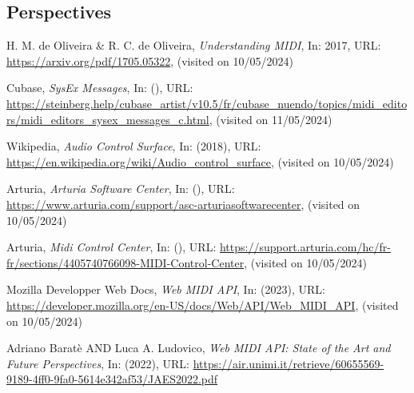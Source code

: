\documentclass[francais]{rapportPFE}  %
\begin{document}
\subsection{Perspectives}





\begin{thebibliography}{9}

      H. M. de Oliveira \& R. C. de Oliveira,
      \textit{Understanding MIDI},
      In: 2017,
      URL: \url{https://arxiv.org/pdf/1705.05322},
      (visited on 10/05/2024)

        Cubase,
        \textit{SysEx Messages},
        In: (),
        URL: \url{https://steinberg.help/cubase_artist/v10.5/fr/cubase_nuendo/topics/midi_editors/midi_editors_sysex_messages_c.html},
        (visited on 11/05/2024)
    
        Wikipedia,
        \textit{Audio Control Surface},
        In: (2018),
        URL: \url{https://en.wikipedia.org/wiki/Audio_control_surface},
        (visited on 10/05/2024)

        Arturia,
        \textit{Arturia Software Center},
        In: (),
        URL: \url{https://www.arturia.com/support/asc-arturiasoftwarecenter},
        (visited on 10/05/2024)

        Arturia,
        \textit{Midi Control Center},
        In: (),
        URL: \url{https://support.arturia.com/hc/fr-fr/sections/4405740766098-MIDI-Control-Center},
        (visited on 10/05/2024)

        Mozilla Developper Web Docs,
        \textit{Web MIDI API},
        In: (2023),
        URL: \url{https://developer.mozilla.org/en-US/docs/Web/API/Web_MIDI_API},
        (visited on 10/05/2024)

    Adriano Baratè AND Luca A. Ludovico,
        \textit{Web MIDI API: State of the Art and Future
        Perspectives},
        In: (2022),
        URL: \url{https://air.unimi.it/retrieve/60655569-9189-4ff0-9fa0-5614e342af53/JAES2022.pdf}


\end{thebibliography}
\end{document}
